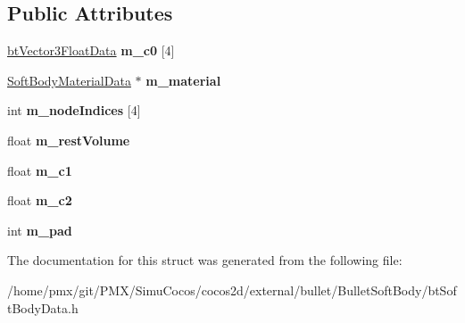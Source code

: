 \subsection*{Public Attributes}
\begin{DoxyCompactItemize}
\item 
\mbox{\label{structSoftBodyTetraData_a627747b5daf322851f14ad7c79ac6ac2}} 
\hyperlink{structbtVector3FloatData}{bt\+Vector3\+Float\+Data} {\bfseries m\+\_\+c0} \mbox{[}4\mbox{]}
\item 
\mbox{\label{structSoftBodyTetraData_a650259aff31d2dc62a4fc860f2b1a5c2}} 
\hyperlink{structSoftBodyMaterialData}{Soft\+Body\+Material\+Data} $\ast$ {\bfseries m\+\_\+material}
\item 
\mbox{\label{structSoftBodyTetraData_a2412381cc83582b0ceaecd1893694ca9}} 
int {\bfseries m\+\_\+node\+Indices} \mbox{[}4\mbox{]}
\item 
\mbox{\label{structSoftBodyTetraData_aabca833d1e9377c1ca76fae6aee7ff39}} 
float {\bfseries m\+\_\+rest\+Volume}
\item 
\mbox{\label{structSoftBodyTetraData_a7dde8f8ceedaff75f33752241875595e}} 
float {\bfseries m\+\_\+c1}
\item 
\mbox{\label{structSoftBodyTetraData_ad810c00250737ca383b0dae52523015d}} 
float {\bfseries m\+\_\+c2}
\item 
\mbox{\label{structSoftBodyTetraData_a3ea4579e1958520489cde140e5f7c442}} 
int {\bfseries m\+\_\+pad}
\end{DoxyCompactItemize}


The documentation for this struct was generated from the following file\+:\begin{DoxyCompactItemize}
\item 
/home/pmx/git/\+P\+M\+X/\+Simu\+Cocos/cocos2d/external/bullet/\+Bullet\+Soft\+Body/bt\+Soft\+Body\+Data.\+h\end{DoxyCompactItemize}
